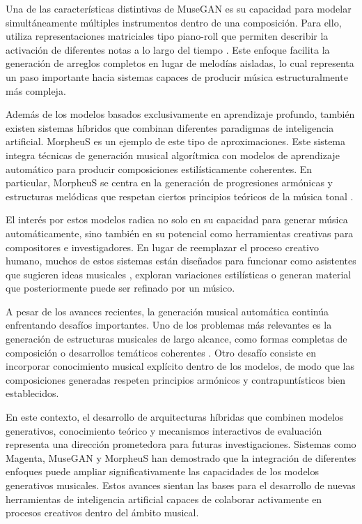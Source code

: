 \documentclass[12pt]{report}
\begin{document}
Una de las características distintivas de MuseGAN es su capacidad para modelar simultáneamente múltiples instrumentos dentro de una composición. Para ello, utiliza representaciones matriciales tipo piano-roll que permiten describir la activación de diferentes notas a lo largo del tiempo \cite{yang2017midinet}. Este enfoque facilita la generación de arreglos completos en lugar de melodías aisladas, lo cual representa un paso importante hacia sistemas capaces de producir música estructuralmente más compleja.

Además de los modelos basados exclusivamente en aprendizaje profundo, también existen sistemas híbridos que combinan diferentes paradigmas de inteligencia artificial. MorpheuS es un ejemplo de este tipo de aproximaciones. Este sistema integra técnicas de generación musical algorítmica con modelos de aprendizaje automático para producir composiciones estilísticamente coherentes. En particular, MorpheuS se centra en la generación de progresiones armónicas y estructuras melódicas que respetan ciertos principios teóricos de la música tonal \cite{herremans2017morpheus}.

El interés por estos modelos radica no solo en su capacidad para generar música automáticamente, sino también en su potencial como herramientas creativas para compositores e investigadores. En lugar de reemplazar el proceso creativo humano, muchos de estos sistemas están diseñados para funcionar como asistentes que sugieren ideas musicales \cite{lippit2021computational}, exploran variaciones estilísticas o generan material que posteriormente puede ser refinado por un músico.

A pesar de los avances recientes, la generación musical automática continúa enfrentando desafíos importantes. Uno de los problemas más relevantes es la generación de estructuras musicales de largo alcance, como formas completas de composición o desarrollos temáticos coherentes \cite{pachet2021learning}. Otro desafío consiste en incorporar conocimiento musical explícito dentro de los modelos, de modo que las composiciones generadas respeten principios armónicos y contrapuntísticos bien establecidos.

En este contexto, el desarrollo de arquitecturas híbridas que combinen modelos generativos, conocimiento teórico y mecanismos interactivos de evaluación representa una dirección prometedora para futuras investigaciones. Sistemas como Magenta, MuseGAN y MorpheuS han demostrado que la integración de diferentes enfoques puede ampliar significativamente las capacidades de los modelos generativos musicales. Estos avances sientan las bases para el desarrollo de nuevas herramientas de inteligencia artificial capaces de colaborar activamente en procesos creativos dentro del ámbito musical.
\end{document}
